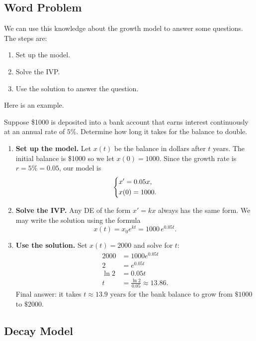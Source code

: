 \documentclass[10pt,letterpaper]{article}
\begin{document}
\subsection{Word Problem}
We can use this knowledge about the growth model to answer some questions. The steps are:
\begin{enumerate}
    \item Set up the model. 
    \item Solve the IVP. 
    \item Use the solution to answer the question.
\end{enumerate}
Here is an example.

\begin{example}[3]{
Suppose \$1000 is deposited into a bank account that earns interest continuously at an annual rate of $5\%$. Determine how long it takes for the balance to double.
}

\begin{enumerate}
\item \textbf{Set up the model.} Let $x(t)$ be the balance in dollars after $t$ years. The initial balance is \$1000 so we let $x(0)=1000$. Since the growth rate is $r=5\% = 0.05$, our model is
\[
\begin{dcases}
x' = 0.05x,\\
x(0)= 1000.
\end{dcases}
\]
\item \textbf{Solve the IVP.} Any DE of the form $x'=kx$ always has the same form. We may write the solution using the formula
\[
x(t) = x_0 e^{kt} =1000\,e^{0.05t}.
\]
\item \textbf{Use the solution.} Set $x(t)=2000$ and solve for $t$:
\begin{align*}
2000 &= 1000 e^{0.05t} \\
2 &= e^{0.05t} \\
\ln 2 &= 0.05t \\
t &= \frac{\ln 2}{0.05} \approx 13.86.
\end{align*}
Final answer: it takes $\boxed{t \approx 13.9 \text{ years}}$ for the bank balance to grow from $\$1000$ to $\$2000$.
\end{enumerate}
\end{example}


\subsection{Decay Model}
\end{document}
